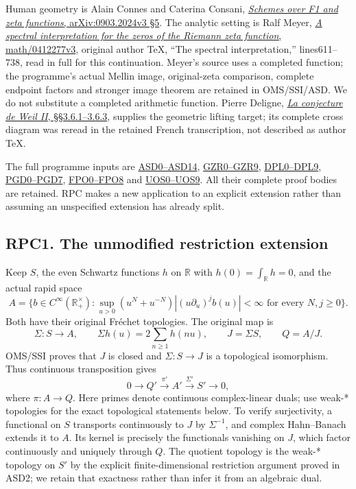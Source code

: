 Human geometry is Alain Connes and Caterina Consani,
\href{https://arxiv.org/abs/0903.2024v3}{\emph{Schemes over F1 and zeta
functions}, arXiv:0903.2024v3 §5}. The analytic setting is Ralf Meyer,
\href{https://arxiv.org/abs/math/0412277v3}{\emph{A spectral
interpretation for the zeros of the Riemann zeta function},
math/0412277v3}, original author TeX, ``The spectral interpretation,''
lines611--738, read in full for this continuation. Meyer's source uses a
completed function; the programme's actual Mellin image, original-zeta
comparison, complete endpoint factors and stronger image theorem are
retained in OMS/SSI/ASD. We do not substitute a completed arithmetic
function. Pierre Deligne,
\href{https://www.numdam.org/item/PMIHES_1980__52__137_0/}{\emph{La
conjecture de Weil II}, §§3.6.1--3.6.3}, supplies the geometric lifting
target; its complete cross diagram was reread in the retained French
transcription, not described as author TeX.

The full programme inputs are
\href{ACTUAL_SUPPORTED_DUALITY_INDEPENDENT.md}{ASD0--ASD14},
\href{GLOBAL_ORIGINAL_ZETA_RESIDUE_DUALITY_INDEPENDENT.md}{GZR0--GZR9},
\href{DUALITY_COKERNEL_POLYNOMIAL_LIFTING_INDEPENDENT.md}{DPL0--DPL9},
\href{GLOBAL_POLYNOMIAL_DUAL_DEFECT.md}{PGD0--PGD7},
\href{FAITHFUL_GLOBAL_PRIME_ORBIT.md}{FPO0--FPO8} and
\href{GLOBAL_UNIT_ORBIT_AND_SUPPORTED_COMPARISON.md}{UOS0--UOS9}. All
their complete proof bodies are retained. RPC makes a new application to
an explicit extension rather than assuming an unspecified extension has
already split.

\subsection{RPC1. The unmodified restriction
extension}\label{rpc1.-the-unmodified-restriction-extension}

Keep \(S\), the even Schwartz functions \(h\) on \(\mathbb R\) with
\(h(0)=\int_{\mathbb R}h=0\), and the actual rapid space \[
A=\{b\in C^\infty(\mathbb R_+^\times):
\sup_{u>0}(u^N+u^{-N})|(u\partial_u)^j b(u)|<\infty
\text{ for every }N,j\ge0\}.
\] Both have their original Fréchet topologies. The original map is \[
\Sigma:S\longrightarrow A,\qquad
\Sigma h(u)=2\sum_{n\ge1}h(nu),\qquad J=\Sigma S,\qquad Q=A/J.
\tag{RPC1.1}
\] OMS/SSI proves that \(J\) is closed and \(\Sigma:S\to J\) is a
topological isomorphism. Thus continuous transposition gives \[
0\longrightarrow Q'\xrightarrow{\pi'}A'
\xrightarrow{\Sigma'}S'\longrightarrow0,
\tag{RPC1.2}
\] where \(\pi:A\to Q\). Here primes denote continuous complex-linear
duals; use weak-* topologies for the exact topological statements below.
To verify surjectivity, a functional on \(S\) transports continuously to
\(J\) by \(\Sigma^{-1}\), and complex Hahn--Banach extends it to \(A\).
Its kernel is precisely the functionals vanishing on \(J\), which factor
continuously and uniquely through \(Q\). The quotient topology is the
weak-* topology on \(S'\) by the explicit finite-dimensional restriction
argument proved in ASD2; we retain that exactness rather than infer it
from an algebraic dual.

